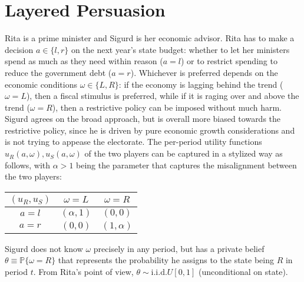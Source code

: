\documentclass[a4paper]{article}
\begin{document}
\section{Layered Persuasion}
Rita is a prime minister and Sigurd is her economic advisor. Rita has to make a decision $a \in \{ l,r \}$ on the next year's state budget: whether to let her ministers spend as much as they need within reason ($a=l$) or to restrict spending to reduce the government debt ($a=r$). Whichever is preferred depends on the economic conditions $\omega \in \{L,R\}$: if the economy is lagging behind the trend ($\omega=L$), then a fiscal stimulus is preferred, while if it is raging over and above the trend ($\omega=R$), then a restrictive policy can be imposed without much harm. 
Sigurd agrees on the broad approach, but is overall more biased towards the restrictive policy, since he is driven by pure economic growth considerations and is not trying to appease the electorate. 
The per-period utility functions $u_R(a,\omega), u_S(a,\omega)$ of the two players can be captured in a stylized way as follows, with $\alpha > 1$ being the parameter that captures the misalignment between the two players:
\begin{center}
	\begin{tabular}{c | c | c |}
		$(u_R,u_S)$ 	& $\omega = L$ 	& $\omega = R$ \\ \hline
		$a=l$ 			& $(\alpha,1)$ 	& $(0,0)$		\\ \hline
		$a=r$			& $(0,0)$	 	& $(1,\alpha)$	\\ \hline
	\end{tabular}
\end{center}

Sigurd does not know $\omega$ precisely in any period, but has a private belief $\theta \equiv \mathbb{P}\{\omega=R\}$ that represents the probability he assigns to the state being $R$ in period $t$. From Rita's point of view, $\theta \sim \text{i.i.d.}U[0,1]$ (unconditional on state).
\end{document}
